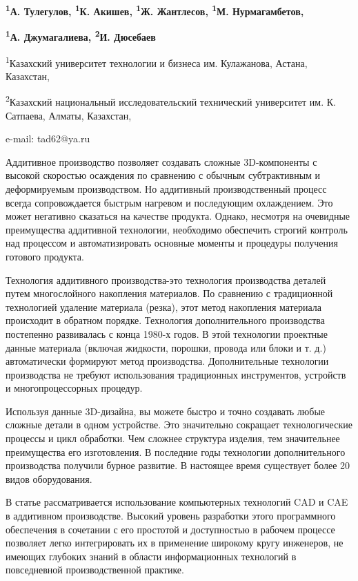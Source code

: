 {\bfseries \textsuperscript{1}А. Тулегулов\textsuperscript{\envelope },
\textsuperscript{1}К. Акишев, \textsuperscript{1}Ж. Жантлесов,
\textsuperscript{1}М. Нурмагамбетов,}

{\bfseries \textsuperscript{1}А. Джумагалиева, \textsuperscript{2}И.
Дюсебаев}

\textsuperscript{1}Казахский университет технологии и бизнеса им.
Кулажанова, Астана, Казахстан,

\textsuperscript{2}Казахский национальный исследовательский технический
университет им. К. Сатпаева, Алматы, Казахстан,

e-mail: tad62@ya.ru

Аддитивное производство позволяет создавать сложные 3D-компоненты с
высокой скоростью осаждения по сравнению с обычным субтрактивным и
деформируемым производством. Но аддитивный производственный процесс
всегда сопровождается быстрым нагревом и последующим охлаждением. Это
может негативно сказаться на качестве продукта. Однако, несмотря на
очевидные преимущества аддитивной технологии, необходимо обеспечить
строгий контроль над процессом и автоматизировать основные моменты и
процедуры получения готового продукта.

Технология аддитивного производства-это технология производства деталей
путем многослойного накопления материалов. По сравнению с традиционной
технологией удаление материала (резка), этот метод накопления материала
происходит в обратном порядке. Технология дополнительного производства
постепенно развивалась с конца 1980-х годов. В этой технологии проектные
данные материала (включая жидкости, порошки, провода или блоки и т. д.)
автоматически формируют метод производства. Дополнительные технологии
производства не требуют использования традиционных инструментов,
устройств и многопроцессорных процедур.

Используя данные 3D-дизайна, вы можете быстро и точно создавать любые
сложные детали в одном устройстве. Это значительно сокращает
технологические процессы и цикл обработки. Чем сложнее структура
изделия, тем значительнее преимущества его изготовления. В последние
годы технологии дополнительного производства получили бурное развитие. В
настоящее время существует более 20 видов оборудования.

В статье рассматривается использование компьютерных технологий CAD и CAE
в аддитивном производстве. Высокий уровень разработки этого программного
обеспечения в сочетании с его простотой и доступностью в рабочем
процессе позволяет легко интегрировать их в применение широкому кругу
инженеров, не имеющих глубоких знаний в области информационных
технологий в повседневной производственной практике.

